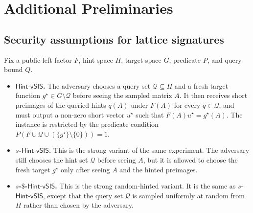 \section{Additional Preliminaries}
\label{app:defs}

\subsection{Security assumptions for lattice signatures}\label{app:assumptions lattices}

Fix a public left factor \(F\), hint space \(H\), target space \(G\), predicate \(P\), and query bound \(Q\).
\begin{itemize}[leftmargin=1.25em]
  \item \textbf{\(\mathsf{Hint\mbox{-}vSIS}\).} The adversary chooses a query set \(\mathcal{Q}\subseteq H\) and a fresh
  target function \(g^\star\in G\setminus \mathcal{Q}\) before seeing the sampled matrix \(A\). It then receives short
  preimages of the queried hints \(q(A)\) under \(F(A)\) for every \(q\in\mathcal{Q}\), and must output a non-zero short
  vector \(u^\star\) such that \(F(A)u^\star=g^\star(A)\). The instance is restricted by the predicate condition
  \(P(F\cup \mathcal{Q}\cup(\{g^\star\}\setminus\{0\}))=1\).
  \item \textbf{\(s\)-\(\mathsf{Hint\mbox{-}vSIS}\).} This is the strong variant of the same experiment. The adversary still
  chooses the hint set \(\mathcal{Q}\) before seeing \(A\), but it is allowed to choose the fresh target \(g^\star\) only
  after seeing \(A\) and the hinted preimages.
  \item \textbf{\(s\)-\(\$\)-\(\mathsf{Hint\mbox{-}vSIS}\).} This is the strong random-hinted variant. It is the same as
  \(s\)-\(\mathsf{Hint\mbox{-}vSIS}\), except that the query set \(\mathcal{Q}\) is sampled uniformly at random from \(H\)
  rather than chosen by the adversary.
\end{itemize}


